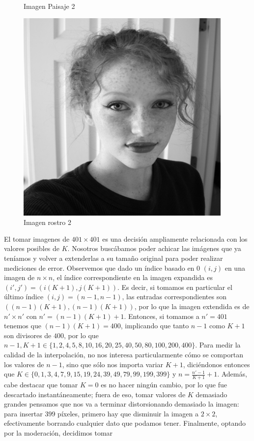 \documentclass{article}
\begin{document}
\begin{figure}[H]
  \caption{Imagen Paisaje 2}\label{fig:paisaje_2}
\endminipage\hfill
{}%
  \includegraphics[width=\linewidth]{rostro_2}
  \caption{Imagen rostro 2}\label{fig:rostro_2}
\endminipage
\end{figure}

El tomar imagenes de $401\times401$ es una decisión ampliamente relacionada con los valores posibles de $K$. Nosotros buscábamos poder achicar las imágenes que ya teníamos y volver a extenderlas a su tamaño original para poder realizar mediciones de error. Observemos que dado un índice basado en 0 $(i, j)$ en una imagen de $n \times n$, el índice correspondiente en la imagen expandida es $(i', j') = (i (K+1), j (K+1))$. Es decir, si tomamos en particular el último índice $(i, j) = (n-1, n-1)$, las entradas correspondientes son $((n-1) (K+1), (n-1) (K+1))$, por lo que la imagen extendida es de $n' \times n'$ con $n' = (n-1) (K+1) + 1$. Entonces, si tomamos a $n' = 401$ tenemos que $(n-1)(K+1) = 400$, implicando que tanto $n-1$ como $K+1$ son divisores de $400$, por lo que $n-1, K+1 \in \{1, 2, 4, 5, 8, 10, 16, 20, 25, 40, 50, 80, 100, 200, 400\}$. Para medir la calidad de la interpolación, no nos interesa particularmente cómo se comportan los valores de $n-1$, sino que sólo nos importa variar $K+1$, diciéndonos entonces que $K \in \{0,1,3,4,7,9,15,19,24,39,49,79,99,199,399\}$ y $n = \frac{n'-1}{K+1} + 1$. Además, cabe destacar que tomar $K = 0$ es no hacer ningún cambio, por lo que fue descartado instantáneamente; fuera de eso, tomar valores de $K$ demasiado grandes pensamos que nos va a terminar distorsionando demasiado la imagen: para insertar $399$ píxeles, primero hay que disminuir la imagen a $2 \times 2$, efectivamente borrando cualquier dato que podamos tener. Finalmente, optando por la moderación, decidimos tomar
\end{document}
